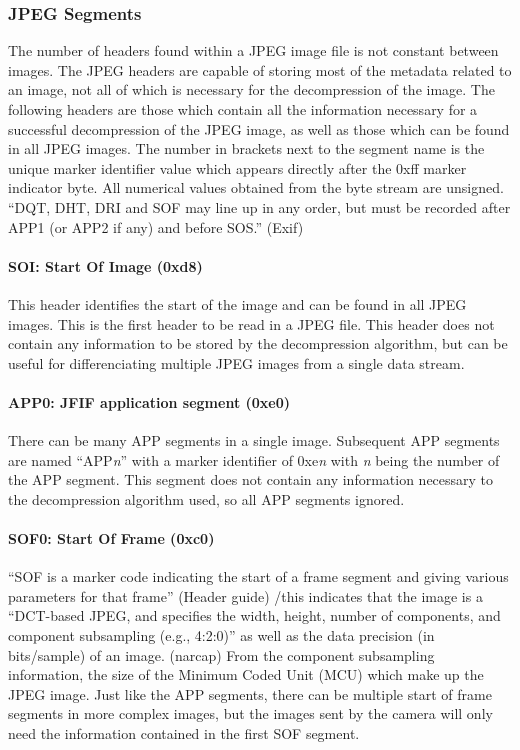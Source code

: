 \subsubsection{JPEG Segments}
The number of headers found within a JPEG image file is not constant between images. The JPEG headers are capable of storing most of the metadata related to an image, not all of which is necessary for the decompression of the image. The following headers are those which contain all the information necessary for a successful decompression of the JPEG image, as well as those which can be found in all JPEG images. The number in brackets next to the segment name is the unique marker identifier value which appears directly after the 0xff marker indicator byte. All numerical values obtained from the byte stream are unsigned. ``DQT, DHT, DRI and SOF may line up in any order, but must be recorded after APP1 (or APP2 if any) and before SOS.'' (Exif)

\paragraph*{SOI: Start Of Image (0xd8)}
This header identifies the start of the image and can be found in all JPEG images. This is the first header to be read in a JPEG file. This header does not contain any information to be stored by the decompression algorithm, but can be useful for differenciating multiple JPEG images from a single data stream.

\paragraph*{APP0: JFIF application segment (0xe0)}
There can be many APP segments in a single image. Subsequent APP segments are named ``APP\emph{n}'' with a marker identifier of 0xe\emph{n} with \emph{n} being the number of the APP segment. This segment does not contain any information necessary to the decompression algorithm used, so all APP segments ignored.

\paragraph*{SOF0: Start Of Frame (0xc0)}
``SOF is a marker code indicating the start of a frame segment and giving various parameters for that frame'' (Header guide) /this indicates that the image is a ``DCT-based JPEG, and specifies the width, height, number of components, and component subsampling (e.g., 4:2:0)'' as well as the data precision (in bits/sample) of an image. (narcap) From the component subsampling information, the size of the Minimum Coded Unit (MCU) which make up the JPEG image. Just like the APP segments, there can be multiple start of frame segments in more complex images, but the images sent by the camera will only need the information contained in the first SOF segment.

